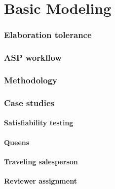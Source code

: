 \part{Basic Modeling}

\section{Elaboration tolerance}

\section{ASP workflow}


\section{Methodology}


\section{Case studies}
\subsection{Satisfiability testing}

\subsection{Queens}

\subsection{Traveling salesperson}

\subsection{Reviewer assignment}

